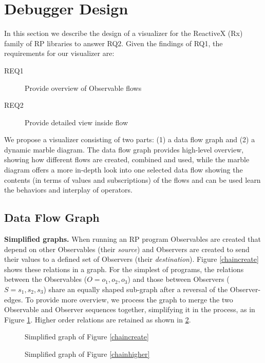 \section{Debugger Design}
\label{section-design}
In this section we describe the design of a visualizer for the ReactiveX (Rx) family of RP libraries to answer RQ2. Given the findings of RQ1, the requirements for our visualizer are:

\begin{description}
\item[REQ1] Provide overview of Observable flows
\item[REQ2] Provide detailed view inside flow
\end{description}

We propose a visualizer consisting of two parts: (1) a data flow graph and (2) a dynamic marble diagram. The data flow graph provides high-level overview, showing how different flows are created, combined and used, while the marble diagram offers a more in-depth look into one selected data flow showing the contents (in terms of values and subscriptions) of the flows and can be used learn the behaviors and interplay of operators.

\subsection{Data Flow Graph}
\textbf{Simplified graphs.} When running an RP program Observables are created that depend on other Observables (their \textit{source}) and Observers are created to send their values to a defined set of Observers (their \textit{destination}). Figure \ref{chaincreate} shows these relations in a graph. For the simplest of programs, the relations between the Observables ($O = {o_1, o_2, o_3}$) and those between Observers ($S = {s_1, s_2, s_3}$) share an equally shaped sub-graph after a reversal of the Observer-edges. To provide more overview, we process the graph to merge the two Observable and Observer sequences together, simplifying it in the process, as in Figure \ref{fiddlesimple}. Higher order relations are retained as shown in \ref{fiddlehigher}.

\begin{figure}[ht]
	\centering
	
	\caption{Simplified graph of Figure \ref{chaincreate}}
	\label{fiddlesimple}
\end{figure}

\begin{figure}[ht]
	\centering
	
	\caption{Simplified graph of Figure \ref{chainhigher}}
	\label{fiddlehigher}
\end{figure}

